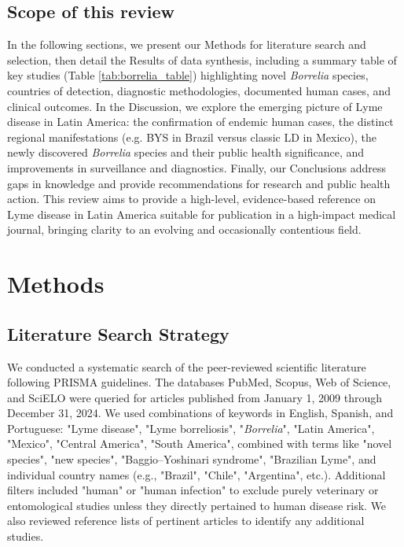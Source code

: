 \documentclass[11pt,letterpaper]{article}
\begin{document}
\subsection{Scope of this review}
In the following sections, we present our Methods for literature search and selection, then detail the Results of data synthesis, including a summary table of key studies (Table \ref{tab:borrelia_table}) highlighting novel \textit{Borrelia} species, countries of detection, diagnostic methodologies, documented human cases, and clinical outcomes. In the Discussion, we explore the emerging picture of Lyme disease in Latin America: the confirmation of endemic human cases, the distinct regional manifestations (e.g. BYS in Brazil versus classic LD in Mexico), the newly discovered \textit{Borrelia} species and their public health significance, and improvements in surveillance and diagnostics. Finally, our Conclusions address gaps in knowledge and provide recommendations for research and public health action. This review aims to provide a high-level, evidence-based reference on Lyme disease in Latin America suitable for publication in a high-impact medical journal, bringing clarity to an evolving and occasionally contentious field.

\section{Methods}
\subsection{Literature Search Strategy}
We conducted a systematic search of the peer-reviewed scientific literature following PRISMA guidelines. The databases PubMed, Scopus, Web of Science, and SciELO were queried for articles published from January 1, 2009 through December 31, 2024. We used combinations of keywords in English, Spanish, and Portuguese: "Lyme disease", "Lyme borreliosis", "\textit{Borrelia}", "Latin America", "Mexico", "Central America", "South America", combined with terms like "novel species", "new species", "Baggio–Yoshinari syndrome", "Brazilian Lyme", and individual country names (e.g., "Brazil", "Chile", "Argentina", etc.). Additional filters included "human" or "human infection" to exclude purely veterinary or entomological studies unless they directly pertained to human disease risk. We also reviewed reference lists of pertinent articles to identify any additional studies.
\end{document}
